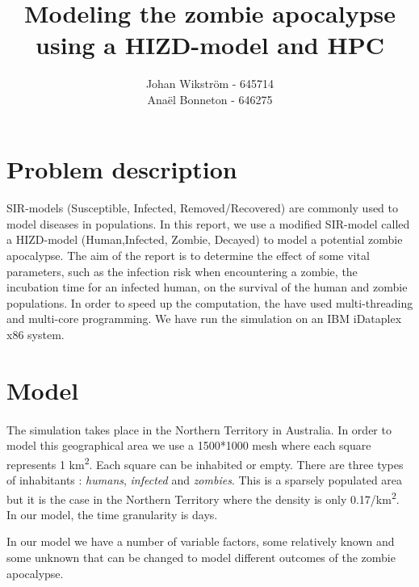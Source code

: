 \documentclass{report}
\begin{document}
\title{Modeling the zombie apocalypse using a HIZD-model and HPC}
\author{Johan Wikström - 645714 \\
        Anaël Bonneton - 646275}
\maketitle
\tableofcontents

\section{Problem description}	

\paragraph{}
SIR-models (Susceptible, Infected, Removed/Recovered) are commonly used to model diseases in populations. In this report, we use a modified SIR-model called a HIZD-model (Human,Infected, Zombie, Decayed) to model a potential zombie apocalypse. The aim of the report is to determine the effect of some vital parameters, such as the infection risk when encountering a zombie, the incubation time for an infected human, on the survival of the human and zombie populations. In order to speed up the computation, the have used multi-threading and multi-core programming. We have run the simulation on an IBM iDataplex x86 system.

\section{Model}

\paragraph{}
The simulation takes place in the Northern Territory in Australia. In order to model this geographical area we use a 1500*1000 mesh where each square represents 1 km\textsuperscript{2}. Each square can be inhabited or empty. There are three types of inhabitants : \emph{humans}, \emph{infected} and \emph{zombies}. This is a sparsely populated area but it is the case in the Northern Territory where the density is only 0.17/km\textsuperscript{2}. In our model, the time granularity is days. 

In our model we have a number of variable factors, some relatively known and some unknown that can be changed to model different outcomes of the zombie apocalypse.
\end{document}
